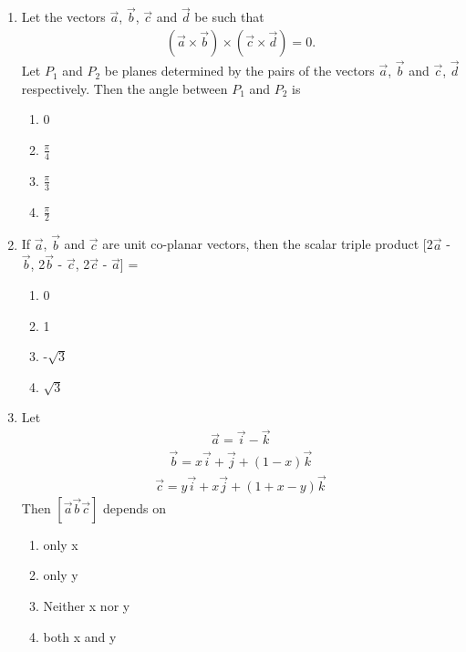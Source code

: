 \begin{enumerate}[label=\arabic*.,ref=\thesubsection.\theenumi]
\item Let the vectors $\overrightarrow{a}$, $\overrightarrow{b}$, $\overrightarrow{c}$ and 
$\overrightarrow{d}$ be such that 
\begin{align*}
(\overrightarrow{a} \times \overrightarrow{b}) \times (\overrightarrow{c} \times \overrightarrow{d}) = 0.
\end{align*}
Let $P_1$ and $P_2$ be planes determined by the pairs of the vectors $\overrightarrow{a}$, $\overrightarrow{b}$ and $\overrightarrow{c}$, $\overrightarrow{d}$ respectively. Then the angle between $P_1$ and $P_2$ is
\begin{enumerate}
\item 0
\item $\frac{\pi}{4}$
\item $\frac{\pi}{3}$
\item $\frac{\pi}{2}$
\end{enumerate}

\item If $\overrightarrow{a}$, $\overrightarrow{b}$ and $\overrightarrow{c}$ are unit co-planar vectors, then the scalar triple product [2$\overrightarrow{a}$ - $\overrightarrow{b}$, 2$\overrightarrow{b}$ - $\overrightarrow{c}$, 2$\overrightarrow{c}$ - $\overrightarrow{a}$] = 
\begin{enumerate}
\item 0
\item 1
\item -$\sqrt{3}$
\item $\sqrt{3}$
\end{enumerate}

\item Let 
\begin{align*}
\overrightarrow{a} = \overrightarrow{i} - \overrightarrow{k}
\end{align*}
\begin{align*}
\overrightarrow{b} = x\overrightarrow{i} + \overrightarrow{j} + (1 - x)\overrightarrow{k}
\end{align*}
\begin{align*}
\overrightarrow{c} = y\overrightarrow{i} + x\overrightarrow{j} + (1 + x -y)\overrightarrow{k}
\end{align*}
Then $[\overrightarrow{a}\overrightarrow{b}\overrightarrow{c}]$ depends on
\begin{enumerate}
\item only x
\item only y
\item Neither x nor y
\item both x and y
\end{enumerate}


\end{enumerate}
